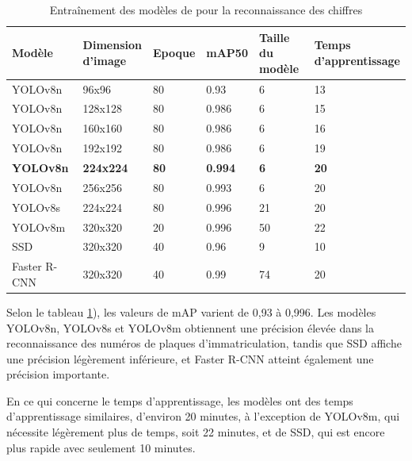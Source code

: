 \begin{table}[H]
    \centering
    \begin{tabular}{|l|l|l|l|l|l|}
    \hline
        Modèle & \shortstack{Dimension \\d'image } & Epoque &    mAP50 & \shortstack{Taille \\du modèle}   &  \shortstack{Temps \\ d'apprentissage}     \\ \hline
        YOLOv8n & 96x96          &   80         & 0.93   & 6 & 13  \\ \hline
        YOLOv8n & 128x128         &   80       & 0.986   &  6 &  15\\ \hline
        YOLOv8n & 160x160          &   80       & 0.986   &6  & 16 \\ \hline
        YOLOv8n & 192x192         &    80      & 0.986    &6  & 19 \\ \hline
        \textbf{YOLOv8n} & \textbf{224x224} &\textbf{80}& \textbf{0.994}& \textbf{6} &\textbf{20}\\ \hline
        YOLOv8n &  256x256         &   80     & 0.993    & 6 & 20 \\ \hline
        YOLOv8s & 224x224          &   80      & 0.996   & 21 &  20\\ \hline
        YOLOv8m & 320x320          &    20    & 0.996     & 50  & 22 \\ \hline
        SSD      & 320x320         &   40      & 0.96        & 9 & 10 \\ \hline
        Faster R-CNN & 320x320      & 40        & 0.99    & 74 &  20\\ \hline
    \end{tabular}
    \caption{Entraînement des modèles de pour la reconnaissance des chiffres}
    \label{table:ch4-training_ocr_allmodels}
\end{table}


Selon le tableau \ref{table:ch4-training_ocr_allmodels}), les valeurs de mAP varient de 0,93 à 0,996. Les modèles YOLOv8n, YOLOv8s et YOLOv8m obtiennent une précision élevée dans la reconnaissance des numéros de plaques d'immatriculation, tandis que SSD affiche une précision légèrement inférieure, et Faster R-CNN atteint également une précision importante.

En ce qui concerne le temps d'apprentissage, les modèles ont des temps d'apprentissage similaires, d'environ 20 minutes, à l'exception de YOLOv8m, qui nécessite légèrement plus de temps, soit 22 minutes, et de SSD, qui est encore plus rapide avec seulement 10 minutes.

